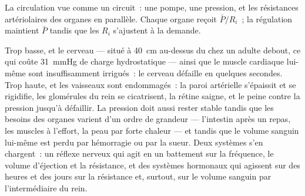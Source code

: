 \begin{omfigure}

{\small La circulation vue comme un circuit~: une pompe, une pression, et
les résistances artériolaires des organes en parallèle. Chaque organe
reçoit $\bar P/R_i$~; la régulation maintient $\bar P$ tandis que les
$R_i$ s'ajustent à la demande.}
\end{omfigure}

\begin{proposition}\label{prop:b2:blood-pressure:why}
Trop basse, et le cerveau --- situé à \qty{40}{cm} au-dessus du  chez un
adulte debout, ce qui coûte \qty{31}{mmHg} de charge hydrostatique ---
ainsi que le muscle cardiaque lui-même sont insuffisamment irrigués~: le
cerveau défaille en quelques secondes. Trop haute, et les vaisseaux sont
endommagés~: la paroi artérielle s'épaissit et se rigidifie, les
glomérules du rein se cicatrisent, la rétine saigne, et le  peine
contre la pression jusqu'à défaillir. La pression doit aussi rester
stable tandis que les besoins des organes varient d'un ordre de grandeur
--- l'intestin après un repas, les muscles à l'effort, la peau par forte
chaleur --- et tandis que le volume sanguin lui-même est perdu par
hémorragie ou par la sueur. Deux systèmes s'en chargent~: un réflexe
nerveux qui agit en un battement sur la fréquence, le volume d'éjection
et la résistance, et des systèmes hormonaux qui agissent sur des heures
et des jours sur la résistance et, surtout, sur le volume sanguin par
l'intermédiaire du rein.
\end{proposition}

